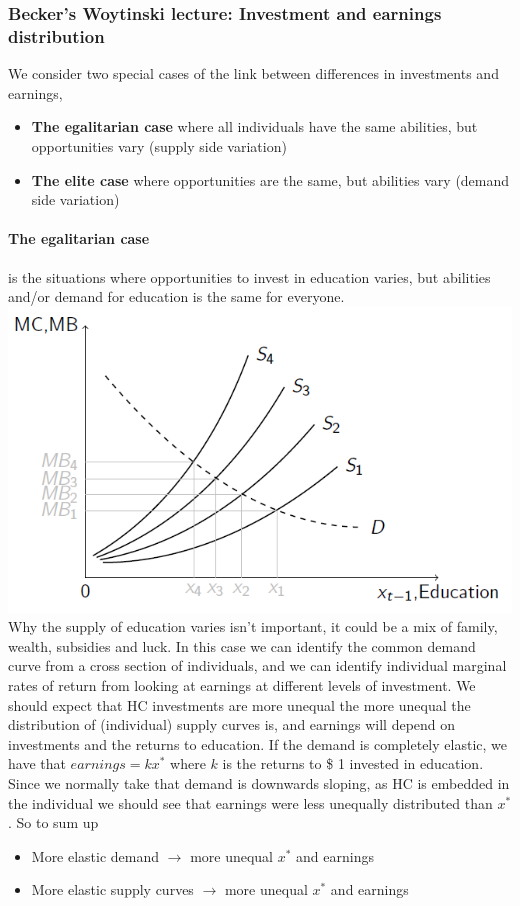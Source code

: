 \documentclass[12pt, a4paper]{article}
\begin{document}
\begin{multicols}{2}
\subsubsection{Becker's Woytinski lecture: Investment and earnings distribution}
We consider two special cases of the link between differences in investments and earnings,
\begin{itemize}
\item \textbf{The egalitarian case} where all individuals have the same abilities, but opportunities vary (supply side variation)
\item \textbf{The elite case} where opportunities are the same, but abilities vary (demand side variation)
\end{itemize}
\paragraph{The egalitarian case} is the situations where opportunities to invest in education varies, but abilities and/or demand for education is the same for everyone.
\includegraphics[width = 0.45 \textwidth]{egal.PNG}
Why the supply of education varies isn't important, it could be a mix of family, wealth, subsidies and luck.  In this case we can identify the common demand curve from a cross section of individuals, and we can identify individual marginal rates of return from looking at earnings at different levels of investment. We should expect that HC investments are more unequal the more unequal the distribution of (individual) supply curves is, and earnings will depend on investments and the returns to education. If the demand is completely elastic, we have that $earnings = k x^*$ where $k$ is the returns to \$ 1 invested in education. Since we normally take that demand is downwards sloping, as HC is embedded in the individual we should see that earnings were less unequally distributed than $x^*$. So to sum up
\begin{itemize}
\item More elastic demand $\rightarrow$ more unequal $x^*$ and earnings
\item More elastic supply curves $\rightarrow$ more unequal $x^*$ and earnings
\end{itemize}


\end{multicols}
\end{document}

